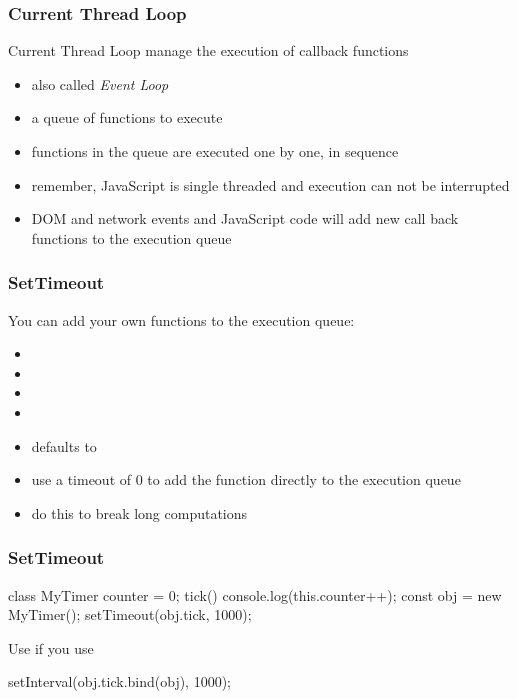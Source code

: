 \begin{frame}[fragile] \frametitle{Current Thread Loop}
Current Thread Loop manage the execution of callback functions
\begin{itemize}
  \item also called \emph{Event Loop}
  \item a queue of functions to execute
  \item functions in the queue are executed one by one, in sequence
  \item remember, JavaScript is single threaded and execution can not be interrupted
  \item DOM and network events and JavaScript code will add new call back functions to the execution queue
\end{itemize}
\end{frame}

\begin{frame}[fragile] \frametitle{SetTimeout}
You can add your own functions to the execution queue:
\begin{itemize}
  \item {}
  \item {}
  \item {}
  \item {}
  \item {} defaults to 
  \item use a timeout of 0 to add the function directly to the execution queue
  \item do this to break long computations
\end{itemize}
\end{frame}

\begin{frame}[fragile] \frametitle{SetTimeout}
\begin{CodeBox}{}
class MyTimer {
  counter = 0;
  tick() {
    console.log(this.counter++);
  }
}
const obj = new MyTimer();
setTimeout(obj.tick, 1000);
\end{CodeBox}
\vspace{4mm}
Use  if you use 
\vspace{4mm}
\begin{CodeBox}{}
setInterval(obj.tick.bind(obj), 1000);
\end{CodeBox}

\end{frame}

